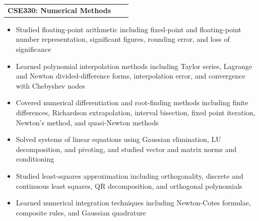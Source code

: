 \documentclass[a4paper,12pt]{article}
\makeatletter
\newenvironment{joblong}[2]
    {
    \begin{tabularx}{\linewidth}{@{}l X r@{}}
    \textbf{#1} & \hfill &  #2 \\[3.75pt]
    \end{tabularx}
    \begin{minipage}[t]{\linewidth}
    \begin{itemize}[nosep,after=\strut, leftmargin=1em, itemsep=3pt,label=--]
    }
    {
    \end{itemize}
    \end{minipage}    
    }
\makeatother
\begin{document}
\begin{joblong}{CSE330: Numerical Methods}{}
	\item Studied floating-point arithmetic including fixed-point and floating-point number representation, significant figures, rounding error, and loss of significance
	\item Learned polynomial interpolation methods including Taylor series, Lagrange and Newton divided-difference forms, interpolation error, and convergence with Chebyshev nodes
	\item Covered numerical differentiation and root-finding methods including finite differences, Richardson extrapolation, interval bisection, fixed point iteration, Newton's method, and quasi-Newton methods
	\item Solved systems of linear equations using Gaussian elimination, LU decomposition, and pivoting, and studied vector and matrix norms and conditioning
	\item Studied least-squares approximation including orthogonality, discrete and continuous least squares, QR decomposition, and orthogonal polynomials
	\item Learned numerical integration techniques including Newton-Cotes formulae, composite rules, and Gaussian quadrature
\end{joblong}

\end{document}
